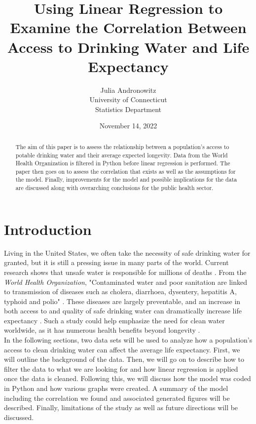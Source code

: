 \documentclass[12pt]{article}
\title{Using Linear Regression to Examine the Correlation Between Access to Drinking Water and Life Expectancy}
\author{Julia Andronowitz\\
University of Connecticut\\Statistics Department}
\date{November 14, 2022}
\begin{document}
\maketitle

\begin{abstract}

The aim of this paper is to assess the relationship between a population's access to potable drinking water and their average expected longevity. Data from the World Health Organization is filtered in Python before linear regression is performed. The paper then goes on to assess the correlation that exists as well as the assumptions for the model. Finally, improvements for the model and possible implications for the data are discussed along with overarching conclusions for the public health sector.

\end{abstract}

\section{Introduction}

Living in the United States, we often take the necessity of safe drinking water for granted, but it is still a pressing issue in many parts of the world. Current research shows that unsafe water is responsible for millions of deaths \citep{ritchieroser2019water}. From the \textit{World Health Organization}, "Contaminated water and poor sanitation are linked to transmission of diseases such as cholera, diarrhoea, dysentery, hepatitis A, typhoid and polio" \citep{who2017water}. These diseases are largely preventable, and an increase in both access to and quality of safe drinking water can dramatically increase life expectancy \citep{angelakis2021quality}. Such a study could help emphasize the need for clean water worldwide, as it has numerous health benefits beyond longevity \citep{popkin2010waterhealth}. \\

In the following sections, two data sets will be used to analyze how a population's access to clean drinking water can affect the average life expectancy. First, we will outline the background of the data. Then, we will go on to describe how to filter the data to what we are looking for and how linear regression is applied once the data is cleaned. Following this, we will discuss how the model was coded in Python and how various graphs were created. A summary of the model including the correlation we found and associated generated figures will be described. Finally, limitations of the study as well as future directions will be discussed.
\end{document}
